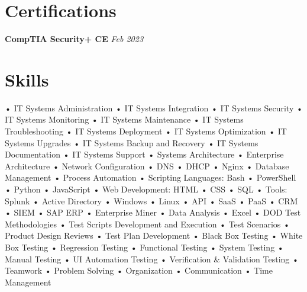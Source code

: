 \documentclass[a4paper,10pt]{article}
\begin{document}
\section{Certifications}
\textbf{CompTIA Security+ CE} \hfill \textit{Feb 2023}

\section*{Skills}


\begin{itemize}
    • IT Systems Administration • IT Systems Integration • IT Systems Security 
    • IT Systems Monitoring • IT Systems Maintenance • IT Systems Troubleshooting 
    • IT Systems Deployment • IT Systems Optimization • IT Systems Upgrades 
    • IT Systems Backup and Recovery • IT Systems Documentation • IT Systems Support 
    • Systems Architecture • Enterprise Architecture • Network Configuration 
    • DNS • DHCP • Nginx • Database Management • Process Automation 
    • Scripting Languages: Bash • PowerShell • Python • JavaScript 
    • Web Development: HTML • CSS • SQL 
    • Tools: Splunk • Active Directory • Windows • Linux 
    • API • SaaS • PaaS • CRM • SIEM • SAP ERP 
    • Enterprise Miner • Data Analysis • Excel 
    • DOD Test Methodologies • Test Scripts Development and Execution 
    • Test Scenarios • Product Design Reviews • Test Plan Development 
    • Black Box Testing • White Box Testing • Regression Testing 
    • Functional Testing • System Testing • Manual Testing 
    • UI Automation Testing • Verification \& Validation Testing 
    • Teamwork • Problem Solving • Organization • Communication • Time Management
\end{itemize}
\end{document}

